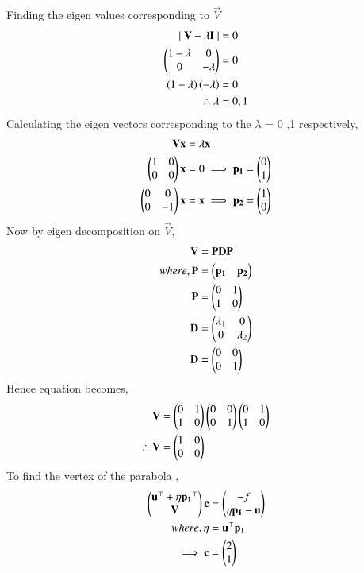 \documentclass[journal,12pt,twocolumn]{IEEEtran}
\begin{document}
Finding the eigen values corresponding to  $\vec{V}$
\begin{align}
    \mid \mathbf{V}- \lambda \mathbf{I} \mid &=0\\
    \begin{pmatrix} 1- \lambda & 0 \\ 0 & -\lambda\end{pmatrix}&=0\\
    \left(1 - \lambda\right)\left(-\lambda\right)&=0 \\
    \therefore \lambda &= 0 ,1 
\end{align}
Calculating the eigen vectors corresponding to the $\lambda$ = 0 ,1 respectively,
\begin{align}
    \mathbf{V}\mathbf{x}&=\lambda\mathbf{x}\\
    \begin{pmatrix}1 & 0 \\ 0 & 0\end{pmatrix}\mathbf{x}&=0 \implies \mathbf{p_{1}}=\begin{pmatrix}0 \\1\end{pmatrix}\\
    \begin{pmatrix}0 & 0 \\ 0 & -1\end{pmatrix}\mathbf{x} &= \mathbf{x} \implies \mathbf{p_{2}}= \begin{pmatrix}1 \\ 0\end{pmatrix} 
\end{align}
Now by eigen decomposition on $\vec{V}$,
\begin{align}
    \mathbf{V}&= \mathbf{P}\mathbf{D}\mathbf{P}^{\top}\\
    where,\mathbf{P}&= \begin{pmatrix}\mathbf{p_{1}}&\mathbf{p_{2}}\end{pmatrix}\\
    \mathbf{P}&=\begin{pmatrix} 0 & 1 \\ 1 & 0\end{pmatrix}\\
    \mathbf{D}&= \begin{pmatrix}\lambda_{1} & 0 \\ 0 & \lambda_{2}\end{pmatrix}\\
    \mathbf{D}&= \begin{pmatrix}0 & 0 \\ 0 & 1\end{pmatrix}
\end{align}
Hence equation becomes,
\begin{align}
    \mathbf{V}&= \begin{pmatrix} 0 & 1 \\ 1 & 0\end{pmatrix}\begin{pmatrix}0 & 0 \\ 0 & 1\end{pmatrix}\begin{pmatrix} 0 & 1 \\ 1 & 0\end{pmatrix}\\
    \therefore \mathbf{V}&=\begin{pmatrix}1 & 0 \\ 0 & 0\end{pmatrix}
\end{align}
To find the vertex of the parabola ,
\begin{align}
    \begin{pmatrix}\mathbf{u}^{\top}+ \eta \mathbf{p_1}^{\top} \\ \mathbf{V}\end{pmatrix}\mathbf{c} &= \begin{pmatrix}-f \\ \eta \mathbf{p_1}-\mathbf{u}\end{pmatrix}\\
    where, \eta &= \mathbf{u}^{\top}\mathbf{p_1}\\
    \implies
    \mathbf{c}&=\begin{pmatrix}2\\1\end{pmatrix}
\end{align}
\end{document}
